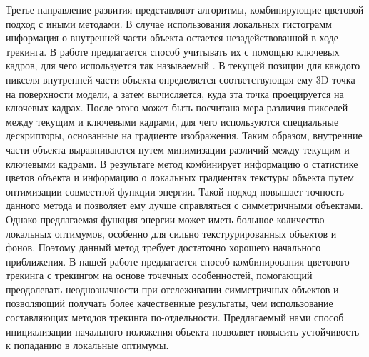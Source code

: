 Третье направление развития представляют алгоритмы, комбинирующие
цветовой подход с иными методами.
В случае использования локальных гистограмм информация о внутренней части
объекта остается незадействованной в ходе трекинга.
В работе \cite{Zhong2018} предлагается способ учитывать их с помощью ключевых
кадров, для чего используется так называемый .
В текущей позиции для каждого пикселя внутренней части объекта
определяется соответствующая ему 3D-точка на поверхности модели,
а затем вычисляется, куда эта точка проецируется на ключевых кадрах.
После этого может быть посчитана мера различия пикселей между текущим и
ключевыми кадрами, для чего используются специальные дескрипторы, основанные на
градиенте изображения.
Таким образом, внутренние части объекта выравниваются путем минимизации
различий между текущим и ключевыми кадрами.
В результате метод \cite{Zhong2018} комбинирует информацию о статистике цветов
объекта и информацию о локальных градиентах текстуры объекта путем оптимизации
совместной функции энергии.
Такой подход повышает точность данного метода и позволяет ему лучше справляться
с симметричными объектами. Однако предлагаемая функция энергии может иметь
большое количество локальных оптимумов, особенно для сильно текструрированных
объектов и фонов. Поэтому данный метод требует достаточно хорошего начального приближения.
В нашей работе предлагается способ комбинирования цветового трекинга с
трекингом на основе точечных особенностей, помогающий преодолевать
неоднозначности при отслеживании симметричных объектов и позволяющий получать
более качественные результаты, чем использование составляющих методов
трекинга по-отдельности. Предлагаемый нами способ инициализации начального положения объекта
позволяет повысить устойчивость к попаданию в локальные оптимумы.
